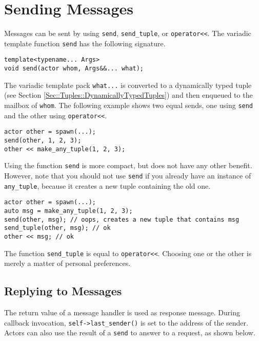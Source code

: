 \section{Sending Messages}
\label{Sec::Send}

Messages can be sent by using \lstinline^send^, \lstinline^send_tuple^, or \lstinline^operator<<^. The variadic template function \lstinline^send^ has the following signature.

\begin{lstlisting}
template<typename... Args>
void send(actor whom, Args&&... what);
\end{lstlisting}

The variadic template pack \lstinline^what...^ is converted to a dynamically typed tuple (see Section \ref{Sec::Tuples::DynamicallyTypedTuples}) and then enqueued to the mailbox of \lstinline^whom^.
The following example shows two equal sends, one using \lstinline^send^ and the other using \lstinline^operator<<^.

\begin{lstlisting}
actor other = spawn(...);
send(other, 1, 2, 3);
other << make_any_tuple(1, 2, 3);
\end{lstlisting}

Using the function \lstinline^send^ is more compact, but does not have any other benefit.
However, note that you should not use \lstinline^send^ if you already have an instance of \lstinline^any_tuple^, because it creates a new tuple containing the old one.

\begin{lstlisting}
actor other = spawn(...);
auto msg = make_any_tuple(1, 2, 3);
send(other, msg); // oops, creates a new tuple that contains msg
send_tuple(other, msg); // ok
other << msg; // ok
\end{lstlisting}

The function \lstinline^send_tuple^ is equal to \lstinline^operator<<^.
Choosing one or the other is merely a matter of personal preferences.

\clearpage
\subsection{Replying to Messages}
\label{Sec::Send::Reply}

The return value of a message handler is used as response message.
During callback invocation, \lstinline^self->last_sender()^ is set to the address of the sender.
Actors can also use the result of a \lstinline^send^ to answer to a request, as shown below.

